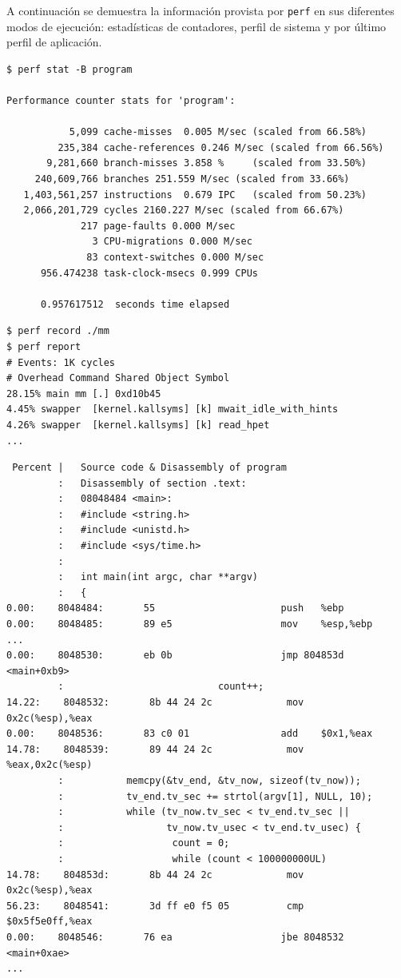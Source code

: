\documentclass[a4paper]{report}
\begin{document}
A continuación se demuestra la información provista por {\tt perf} en sus diferentes modos de ejecución: estadísticas de contadores, perfil de sistema y por último perfil de aplicación.

\begin{lstlisting}
$ perf stat -B program

Performance counter stats for 'program':

           5,099 cache-misses  0.005 M/sec (scaled from 66.58%)
         235,384 cache-references 0.246 M/sec (scaled from 66.56%)
       9,281,660 branch-misses 3.858 %     (scaled from 33.50%)
     240,609,766 branches 251.559 M/sec (scaled from 33.66%)
   1,403,561,257 instructions  0.679 IPC   (scaled from 50.23%)
   2,066,201,729 cycles 2160.227 M/sec (scaled from 66.67%)
             217 page-faults 0.000 M/sec
               3 CPU-migrations 0.000 M/sec
              83 context-switches 0.000 M/sec
      956.474238 task-clock-msecs 0.999 CPUs

      0.957617512  seconds time elapsed
\end{lstlisting}

\begin{lstlisting}
$ perf record ./mm
$ perf report
# Events: 1K cycles
# Overhead Command Shared Object Symbol
28.15% main mm [.] 0xd10b45
4.45% swapper  [kernel.kallsyms] [k] mwait_idle_with_hints
4.26% swapper  [kernel.kallsyms] [k] read_hpet
...
\end{lstlisting}

\begin{lstlisting}
 Percent |   Source code & Disassembly of program
         :   Disassembly of section .text:
         :   08048484 <main>:
         :   #include <string.h>
         :   #include <unistd.h>
         :   #include <sys/time.h>
         :
         :   int main(int argc, char **argv)
         :   {
0.00:    8048484:       55                      push   %ebp
0.00:    8048485:       89 e5                   mov    %esp,%ebp
...
0.00:    8048530:       eb 0b                   jmp 804853d <main+0xb9>
         :                           count++;
14.22:    8048532:       8b 44 24 2c             mov    0x2c(%esp),%eax
0.00:    8048536:       83 c0 01                add    $0x1,%eax
14.78:    8048539:       89 44 24 2c             mov    %eax,0x2c(%esp)
         :           memcpy(&tv_end, &tv_now, sizeof(tv_now));
         :           tv_end.tv_sec += strtol(argv[1], NULL, 10);
         :           while (tv_now.tv_sec < tv_end.tv_sec ||
         :                  tv_now.tv_usec < tv_end.tv_usec) {
         :                   count = 0;
         :                   while (count < 100000000UL)
14.78:    804853d:       8b 44 24 2c             mov    0x2c(%esp),%eax
56.23:    8048541:       3d ff e0 f5 05          cmp    $0x5f5e0ff,%eax
0.00:    8048546:       76 ea                   jbe 8048532 <main+0xae>
...
\end{lstlisting}
\end{document}
